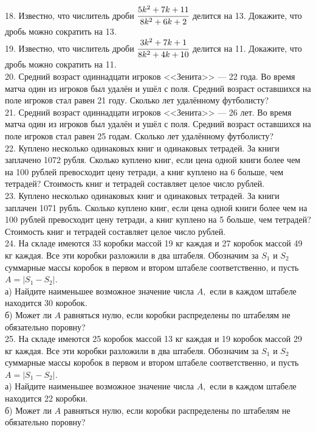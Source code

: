 \documentclass[12pt]{article}
\begin{document}
18. Известно, что числитель дроби $\cfrac{5k^2+7k+11}{8k^2+6k+2}$ делится на 13. Докажите, что дробь можно сократить на 13.\\
19. Известно, что числитель дроби $\cfrac{3k^2+7k+1}{8k^2+4k+10}$ делится на 11. Докажите, что дробь можно сократить на 11.\\
20. Средний возраст одиннадцати игроков <<Зенита>> --- 22 года. Во время матча один из игроков был удалён и ушёл с поля. Средний возраст оставшихся на поле игроков стал равен 21 году. Сколько лет удалённому футболисту?\\
21. Средний  возраст одиннадцати игроков <<Зенита>> --- 26 лет. Во время матча один из игроков был удалён и ушёл с поля. Средний возраст оставшихся на поле игроков стал равен 25 годам. Сколько лет удалённому футболисту?\\
22. Куплено несколько одинаковых книг и одинаковых тетрадей. За книги заплачено 1072 рубля. Сколько куплено книг, если цена одной книги более чем на 100 рублей превосходит цену тетради, а книг куплено на 6 больше, чем тетрадей? Стоимость книг и тетрадей составляет целое число рублей.\\
23. Куплено несколько одинаковых книг и одинаковых тетрадей. За книги заплачен 1071 рубль. Сколько куплено книг, если цена одной книги более чем на 100 рублей превосходит цену тетради, а книг куплено на 5 больше, чем тетрадей? Стоимость книг и тетрадей составляет целое число рублей.\\
24. На складе имеются 33 коробки массой 19 кг каждая и 27 коробок массой 49 кг каждая. Все эти коробки разложили в два штабеля. Обозначим за $S_1$ и $S_2$ суммарные массы коробок в первом и втором штабеле соответственно, и пусть $A=|S_1-S_2|.$\\
а) Найдите наименьшее возможное значение числа $A,$ если в каждом штабеле находится 30 коробок.\\
б) Может ли $A$ равняться нулю, если коробки распределены по штабелям не обязательно поровну?\\
25. На складе имеются 25 коробок массой 13 кг каждая и 19 коробок массой 29 кг каждая. Все эти коробки разложили в два штабеля. Обозначим за $S_1$ и $S_2$ суммарные массы коробок в первом и втором штабеле соответственно, и пусть $A=|S_1-S_2|.$\\
а) Найдите наименьшее возможное значение числа $A,$ если в каждом штабеле находится 22 коробки.\\
б) Может ли $A$ равняться нулю, если коробки распределены по штабелям не обязательно поровну?\\
\end{document}
